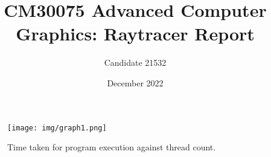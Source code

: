 \documentclass[a4paper]{article}
\title{CM30075 Advanced Computer Graphics: Raytracer Report}
\author{Candidate 21532}
\date{December 2022}
\begin{document}
\maketitle
\tableofcontents

\begin{figure*}[h]
    \centering
    \texttt{[image: img/graph1.png]}
    \caption{Time taken for program execution against thread count.}\label{fig:figure1}
\end{figure*}
\end{document}
